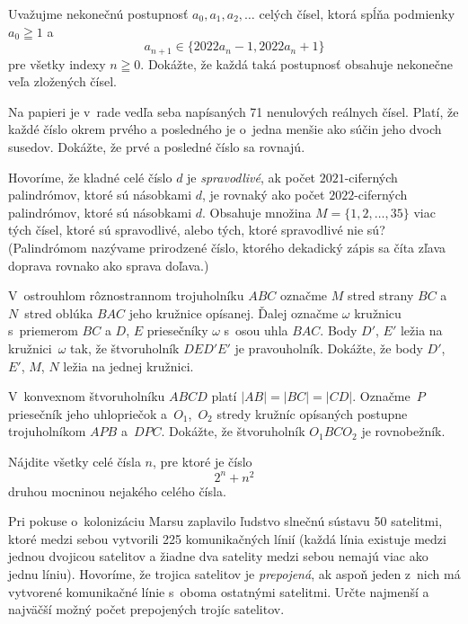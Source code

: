 {%
Uvažujme nekonečnú postupnosť $a_0,a_1,a_2,\ldots$
celých čísel, ktorá spĺňa podmienky $a_0\geqq1$ a
$$
a_{n+1}\in\{2022a_n-1, 2022a_n+1\}
$$
pre všetky indexy $n\geqq0$. Dokážte, že každá taká postupnosť
obsahuje nekonečne veľa zložených čísel.}

{%
Na papieri je v~rade vedľa seba napísaných 71 nenulových
reálnych čísel. Platí, že každé číslo okrem prvého a posledného
je o~jedna menšie ako súčin jeho dvoch susedov. Dokážte, že prvé
a posledné číslo sa rovnajú.
}

{%
Hovoríme, že kladné celé číslo $d$ je {\it spravodlivé},
ak počet $2021$-ciferných palindrómov, ktoré sú násobkami $d$,
je rovnaký ako počet $2022$-ciferných palindrómov, ktoré sú
násobkami $d$. Obsahuje množina $M=\{1,2,\dots,35\}$ viac tých
čísel, ktoré sú spravodlivé, alebo tých, ktoré spravodlivé
nie sú? (Palindrómom nazývame prirodzené číslo, ktorého dekadický
zápis sa číta zľava doprava rovnako ako sprava doľava.)
}

{%
V~ostrouhlom rôznostrannom trojuholníku $ABC$ označme $M$
stred strany $BC$ a~$N$~stred oblúka $BAC$ jeho kružnice
opísanej.
Ďalej označme $\omega$ kružnicu s~priemerom $BC$ a $D$, $E$
priesečníky $\omega$ s~osou uhla $BAC$. Body $D'$, $E'$ ležia na
kružnici~$\omega$ tak, že štvoruholník $DED'E'$ je pravouholník.
Dokážte, že body $D'$, $E'$, $M$, $N$ ležia na jednej kružnici.
}

{%
V~konvexnom štvoruholníku $ABCD$ platí $|AB|=|BC|=|CD|$.
Označme~$P$ priesečník jeho uhlopriečok a~$O_1$,~$O_2$
stredy kružníc opísaných postupne trojuholníkom $APB$ a~$DPC$.
Dokážte, že štvoruholník $O_1BCO_2$ je rovnobežník.
}

{%
Nájdite všetky celé čísla $n$, pre ktoré je číslo
$$
2^n+n^2
$$
druhou mocninou nejakého celého čísla.
}

{%
Pri pokuse o~kolonizáciu Marsu zaplavilo ľudstvo slnečnú
sústavu 50 satelitmi, ktoré medzi sebou vytvorili 225
komunikačných línií (každá línia existuje medzi jednou dvojicou
satelitov a žiadne dva satelity medzi sebou nemajú viac ako jednu
líniu). Hovoríme, že trojica satelitov je {\it prepojená}, ak aspoň
jeden z~nich má vytvorené komunikačné línie s~oboma ostatnými
satelitmi. Určte najmenší a najväčší možný počet prepojených trojíc
satelitov.
}

